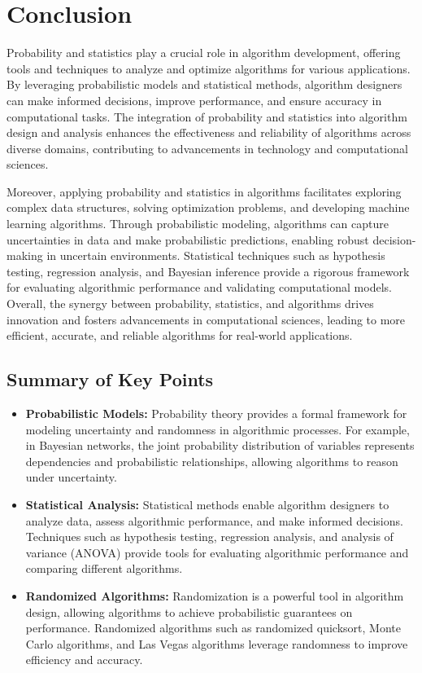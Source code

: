 \documentclass[12pt]{book} %
\begin{document}
\section{Conclusion}

Probability and statistics play a crucial role in algorithm development, offering tools and techniques to analyze and optimize algorithms for various applications. By leveraging probabilistic models and statistical methods, algorithm designers can make informed decisions, improve performance, and ensure accuracy in computational tasks. The integration of probability and statistics into algorithm design and analysis enhances the effectiveness and reliability of algorithms across diverse domains, contributing to advancements in technology and computational sciences.

Moreover, applying probability and statistics in algorithms facilitates exploring complex data structures, solving optimization problems, and developing machine learning algorithms. Through probabilistic modeling, algorithms can capture uncertainties in data and make probabilistic predictions, enabling robust decision-making in uncertain environments. Statistical techniques such as hypothesis testing, regression analysis, and Bayesian inference provide a rigorous framework for evaluating algorithmic performance and validating computational models. Overall, the synergy between probability, statistics, and algorithms drives innovation and fosters advancements in computational sciences, leading to more efficient, accurate, and reliable algorithms for real-world applications.

\subsection{Summary of Key Points}
\begin{itemize}
    \item \textbf{Probabilistic Models:} Probability theory provides a formal framework for modeling uncertainty and randomness in algorithmic processes. For example, in Bayesian networks, the joint probability distribution of variables represents dependencies and probabilistic relationships, allowing algorithms to reason under uncertainty.
    \item \textbf{Statistical Analysis:} Statistical methods enable algorithm designers to analyze data, assess algorithmic performance, and make informed decisions. Techniques such as hypothesis testing, regression analysis, and analysis of variance (ANOVA) provide tools for evaluating algorithmic performance and comparing different algorithms.
    \item \textbf{Randomized Algorithms:} Randomization is a powerful tool in algorithm design, allowing algorithms to achieve probabilistic guarantees on performance. Randomized algorithms such as randomized quicksort, Monte Carlo algorithms, and Las Vegas algorithms leverage randomness to improve efficiency and accuracy.
\end{itemize}
\end{document}
